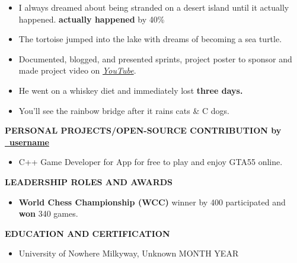 \documentclass[a4paper,10pt]{article}
\newcommand{\Project}
{\begin{flushleft}\begin{large}\textbf{PERSONAL PROJECTS/OPEN-SOURCE CONTRIBUTION by \GitHubURL\ \hrulefill}\end{large}\end{flushleft}}
\newcommand{\Extra}
{\begin{flushleft}\begin{large}\textbf{LEADERSHIP ROLES AND AWARDS \hrulefill}\end{large}\end{flushleft}}
\newcommand{\Education}
{\begin{flushleft}\begin{large}\textbf{EDUCATION AND CERTIFICATION \hrulefill }\end{large}\end{flushleft}}
\newcommand{\GitHubURL}{\href{https://github.com/username/}{\faGithub \ username}}
\begin{document}
\begin{itemize}
\item I always dreamed about being stranded on a desert island until it actually happened. \textbf{actually happened}  by 40\%

\item The tortoise jumped into the lake with dreams of becoming a sea turtle.

\item Documented, blogged, and presented sprints, project poster to sponsor and made project
video on \textit{\href{https:/www.youtube.com}{YouTube}}.

\item He went on a whiskey diet and immediately lost  \textbf{three days.}

\item You'll see the rainbow bridge after it rains cats  \& C dogs.

\end{itemize}\vspace*{5pt}
\vspace*{5pt} \Project
\begin{itemize}
\item C++  Game Developer for   App for free to play and
enjoy GTA55 online.
\end{itemize}\vspace*{5pt}
\vspace*{5pt} \Extra
\begin{itemize}
\item \textbf{World Chess Championship (WCC)} winner by  400 participated
and \textbf{won} 340 games.

\end{itemize}\vspace*{5pt}
\Education

\begin{itemize}
\item {}
\hspace{0.25 in} University of Nowhere \hspace{0.45 in} Milkyway, Unknown \hspace{0.55 in} MONTH YEAR

\end{itemize}
\dotfill
\end{document}
